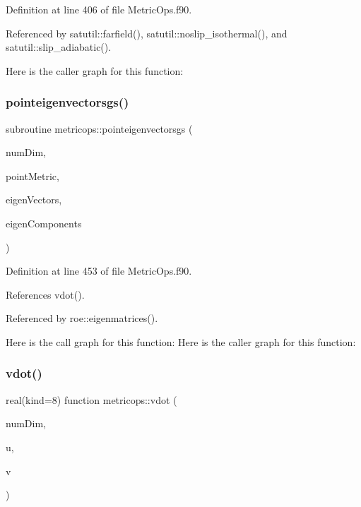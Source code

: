 Definition at line 406 of file Metric\+Ops.\+f90.



Referenced by satutil\+::farfield(), satutil\+::noslip\+\_\+isothermal(), and satutil\+::slip\+\_\+adiabatic().

Here is the caller graph for this function\+:
\hypertarget{namespacemetricops_a6cac925729827357652e938b64681663}{}\label{namespacemetricops_a6cac925729827357652e938b64681663} 
\subsubsection{\texorpdfstring{pointeigenvectorsgs()}{pointeigenvectorsgs()}}
{\footnotesize\ttfamily subroutine metricops\+::pointeigenvectorsgs (\begin{DoxyParamCaption}\item[{integer(kind=4), intent(in)}]{num\+Dim,  }\item[{real(kind=8), dimension(numdim$\ast$numdim), intent(in)}]{point\+Metric,  }\item[{real(kind=8), dimension(numdim$\ast$numdim), intent(out)}]{eigen\+Vectors,  }\item[{real(kind=8), dimension(numdim$\ast$numdim), intent(out)}]{eigen\+Components }\end{DoxyParamCaption})}



Definition at line 453 of file Metric\+Ops.\+f90.



References vdot().



Referenced by roe\+::eigenmatrices().

Here is the call graph for this function\+:
Here is the caller graph for this function\+:
\hypertarget{namespacemetricops_a2ad1b3b390a1df3e16e258eb2bf0d37a}{}\label{namespacemetricops_a2ad1b3b390a1df3e16e258eb2bf0d37a} 
\subsubsection{\texorpdfstring{vdot()}{vdot()}}
{\footnotesize\ttfamily real(kind=8) function metricops\+::vdot (\begin{DoxyParamCaption}\item[{integer(kind=4), intent(in)}]{num\+Dim,  }\item[{real(kind=8), dimension(numdim), intent(in)}]{u,  }\item[{real(kind=8), dimension(numdim), intent(in)}]{v }\end{DoxyParamCaption})}



